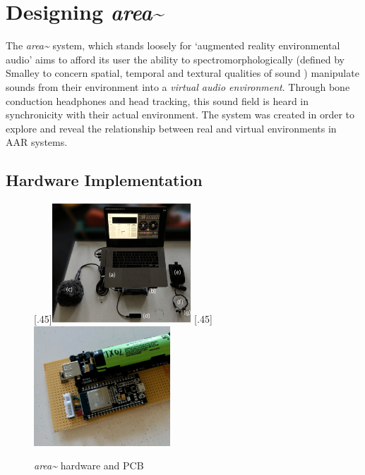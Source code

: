 \section{Designing \textit{area\textasciitilde{}}}\label{sec: area-system}
The \textit{\textit{area\textasciitilde{}}} system, which stands loosely for `augmented reality environmental audio' aims to afford its user the ability to spectromorphologically (defined by Smalley to concern spatial, temporal and textural qualities of sound \citeyearpar{smalley1997}) manipulate sounds from their environment into a \textit{virtual audio environment}. Through bone conduction headphones and head tracking, this sound field is heard in synchronicity with their actual environment. The system was created in order to explore and reveal the relationship between real and virtual environments in AAR systems.

\subsection{Hardware Implementation}\label{sec: area-system-hardware}
\begin{figure}
    \centering
    \subcaptionbox{}[.45\textwidth]{\includegraphics[height=4.5cm]{figures/05-area/areatechnical_hardware.png}}
    \hfill
    \subcaptionbox{}[.45\textwidth]{\includegraphics[height=4.5cm]{figures/05-area/areatechnical_pcb.png}}%
    \caption{\textit{area\textasciitilde{}} hardware and PCB}
    \label{fig: areatechnical}
\end{figure}

